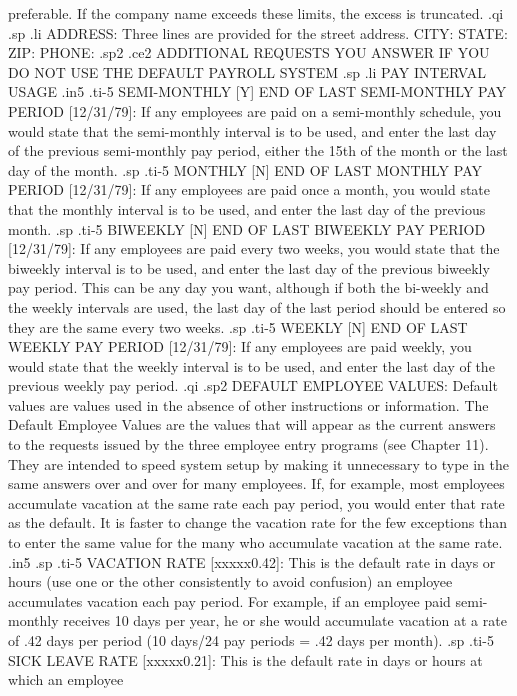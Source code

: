 preferable.  If the company name exceeds these limits, the excess is
truncated.
.qi
.sp
.li
ADDRESS: Three lines are provided for the street address.
CITY:
STATE:
ZIP:
PHONE:
.sp2
.ce2
ADDITIONAL REQUESTS YOU ANSWER
IF YOU DO NOT USE THE DEFAULT PAYROLL SYSTEM
.sp
.li
PAY INTERVAL USAGE
.in5
.ti-5
SEMI-MONTHLY [Y] END OF LAST SEMI-MONTHLY PAY PERIOD [12/31/79]:
If any employees are paid on a semi-monthly schedule, you would state
that the semi-monthly interval is to be used, and enter the last day
of the previous semi-monthly pay period, either the 15th of the month or
the last day of the month.
.sp
.ti-5
MONTHLY [N] END OF LAST MONTHLY PAY PERIOD [12/31/79]:	If any employees
are paid once a month, you would state that the monthly interval is to
be used, and enter the last day of the previous month.
.sp
.ti-5
BIWEEKLY [N] END OF LAST BIWEEKLY PAY PERIOD [12/31/79]: If any employees
are paid every two weeks, you would state that the biweekly interval is
to be used, and enter the last day of the previous biweekly pay period.
This can be any day you want, although if both the bi-weekly and the weekly
intervals are used, the last day of the last period should be entered so
they are the same every two weeks.
.sp
.ti-5
WEEKLY [N] END OF LAST WEEKLY PAY PERIOD [12/31/79]: If any employees are
paid weekly, you would state that the weekly interval is to be used, and
enter the last day of the previous weekly pay period.
.qi
.sp2
DEFAULT EMPLOYEE VALUES: Default values are values used in the absence of other
instructions or information.  The Default Employee Values are the values
that will appear as the current answers to the requests issued by the three
employee entry programs (see Chapter 11).
They are intended to speed system setup
by making it unnecessary to type in the same answers over and over for
many employees.  If, for example, most employees accumulate vacation at the
same rate each pay period, you would enter that rate as the default.  It
is faster to change the vacation rate for the few exceptions than to enter
the same value for the many who accumulate vacation at the same rate.
.in5
.sp
.ti-5
VACATION RATE [xxxxx0.42]: This is the default rate in days or hours
(use one or
the other consistently to avoid confusion) an employee accumulates vacation
each pay period.  For example, if an employee paid semi-monthly
receives 10 days
per year, he or she would accumulate vacation at a rate of .42 days per
period (10 days/24 pay periods = .42 days per month).
.sp
.ti-5
SICK LEAVE RATE [xxxxx0.21]: This is the default rate in days or hours at which
an employee
